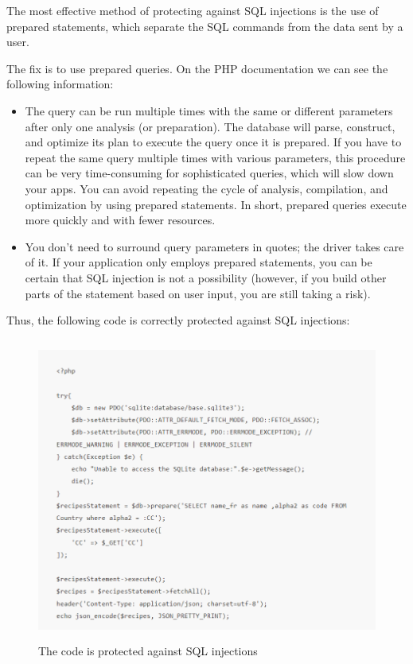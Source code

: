 \begin{itemize}
\begin{itemize}
        The most effective method of protecting against SQL injections is the use of prepared statements, which separate the SQL commands from the data sent by a user.

        The fix is to use prepared queries. On the PHP documentation we can see the following information:
        \begin{itemize}
            \item The query can be run multiple times with the same or different parameters after only one analysis (or preparation). The database will parse, construct, and optimize its plan to execute the query once it is prepared. If you have to repeat the same query multiple times with various parameters, this procedure can be very time-consuming for sophisticated queries, which will slow down your apps. You can avoid repeating the cycle of analysis, compilation, and optimization by using prepared statements. In short, prepared queries execute more quickly and with fewer resources.
            \item You don't need to surround query parameters in quotes; the driver takes care of it. If your application only employs prepared statements, you can be certain that SQL injection is not a possibility (however, if you build other parts of the statement based on user input, you are still taking a risk).
        \end{itemize}
        Thus, the following code is correctly protected against SQL injections:
        \begin{figure}[!h]
         \centering
         \includegraphics[width=\linewidth, height=10cm,keepaspectratio]{figures/ex5.PNG}
         \caption{The code is protected against SQL injections}
        \end{figure}
        

\end{itemize}
\end{itemize}
